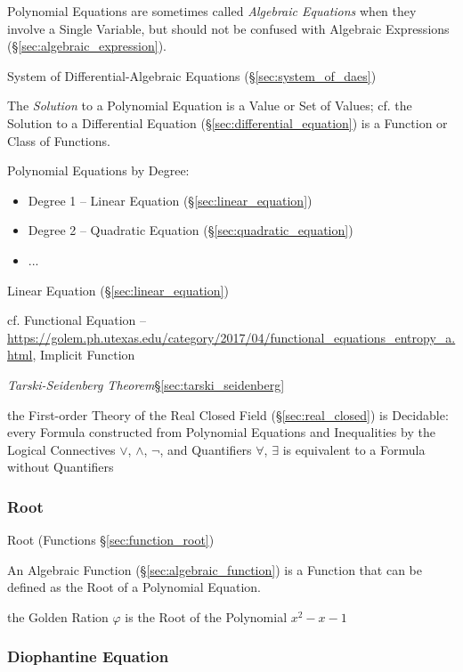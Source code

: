\fist Polynomial Equations are sometimes called \emph{Algebraic Equations} when
they involve a Single Variable, but should not be confused with Algebraic
Expressions (\S\ref{sec:algebraic_expression}).

\fist System of Differential-Algebraic Equations (\S\ref{sec:system_of_daes})

The \emph{Solution} to a Polynomial Equation is a Value or Set of Values; cf.
the Solution to a Differential Equation (\S\ref{sec:differential_equation}) is
a Function or Class of Functions.

Polynomial Equations by Degree:
\begin{itemize}
  \item Degree 1 -- Linear Equation (\S\ref{sec:linear_equation})
  \item Degree 2 -- Quadratic Equation (\S\ref{sec:quadratic_equation})
  \item ...
\end{itemize}

Linear Equation (\S\ref{sec:linear_equation})

cf. Functional Equation --
\url{https://golem.ph.utexas.edu/category/2017/04/functional_equations_entropy_a.html},
Implicit Function %


\emph{Tarski-Seidenberg Theorem}\S\ref{sec:tarski_seidenberg}

the First-order Theory of the Real Closed Field (\S\ref{sec:real_closed}) is
Decidable: every Formula constructed from Polynomial Equations and Inequalities
by the Logical Connectives $\vee$, $\wedge$, $\neg$, and Quantifiers $\forall$,
$\exists$ is equivalent to a Formula without Quantifiers



\subsubsection{Root}\label{sec:equation_root}

\fist Root (Functions \S\ref{sec:function_root})

An Algebraic Function (\S\ref{sec:algebraic_function}) is a Function that can
be defined as the Root of a Polynomial Equation.

the Golden Ration $\varphi$ is the Root of the Polynomial $x^2 - x - 1$



\subsubsection{Diophantine Equation}\label{sec:diophantine_equation}

